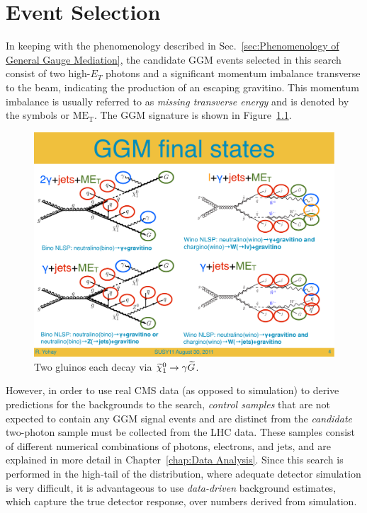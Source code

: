 \documentclass[dissertation.tex]{subfiles}
\begin{document}
\chapter{Event Selection}
\label{chap:Event Selection}

In keeping with the phenomenology described in Sec.~\ref{sec:Phenomenology of General Gauge Mediation}, the candidate GGM events selected in this search consist of two high-$E_{T}$ photons and a significant momentum imbalance transverse to the beam, indicating the production of an escaping gravitino.  This momentum imbalance is usually referred to as \textit{missing transverse energy} and is denoted by the symbols \MET or $\mbox{ME}_{\mathrm{T}}$.  The GGM signature is shown in Figure~\ref{fig:GGM_diphoton_signal_Feynman_diagram}.

\begin{figure}
	\centering
	\includegraphics[scale=0.7]{2photons_jets_MET}
	\caption{Two gluinos each decay via $\widetilde{\chi}_{1}^{0}\rightarrow\gamma\widetilde{G}$.}
	\label{fig:GGM_diphoton_signal_Feynman_diagram}
\end{figure}

However, in order to use real CMS data (as opposed to simulation) to derive predictions for the backgrounds to the search, \textit{control samples} that are not expected to contain any GGM signal events and are distinct from the \textit{candidate} two-photon sample must be collected from the LHC data.  These samples consist of different numerical combinations of photons, electrons, and jets, and are explained in more detail in Chapter~\ref{chap:Data Analysis}.  Since this search is performed in the high-\MET tail of the \MET distribution, where adequate detector simulation is very difficult, it is advantageous to use \textit{data-driven} background estimates, which capture the true detector response, over numbers derived from simulation.
\end{document}
